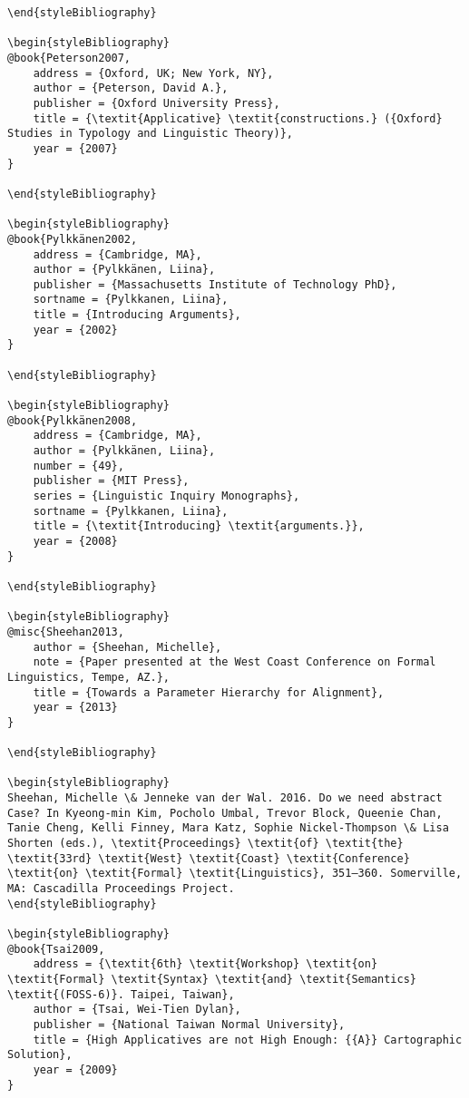 \documentclass[output=paper]{langscibook}
\begin{document}
\begin{verbatim}
\end{styleBibliography}

\begin{styleBibliography}
@book{Peterson2007,
	address = {Oxford, UK; New York, NY},
	author = {Peterson, David A.},
	publisher = {Oxford University Press},
	title = {\textit{Applicative} \textit{constructions.} ({Oxford} Studies in Typology and Linguistic Theory)},
	year = {2007}
}

\end{styleBibliography}

\begin{styleBibliography}
@book{Pylkkänen2002,
	address = {Cambridge, MA},
	author = {Pylkkänen, Liina},
	publisher = {Massachusetts Institute of Technology PhD},
	sortname = {Pylkkanen, Liina},
	title = {Introducing Arguments},
	year = {2002}
}

\end{styleBibliography}

\begin{styleBibliography}
@book{Pylkkänen2008,
	address = {Cambridge, MA},
	author = {Pylkkänen, Liina},
	number = {49},
	publisher = {MIT Press},
	series = {Linguistic Inquiry Monographs},
	sortname = {Pylkkanen, Liina},
	title = {\textit{Introducing} \textit{arguments.}},
	year = {2008}
}

\end{styleBibliography}

\begin{styleBibliography}
@misc{Sheehan2013,
	author = {Sheehan, Michelle},
	note = {Paper presented at the West Coast Conference on Formal Linguistics, Tempe, AZ.},
	title = {Towards a Parameter Hierarchy for Alignment},
	year = {2013}
}

\end{styleBibliography}

\begin{styleBibliography}
Sheehan, Michelle \& Jenneke van der Wal. 2016. Do we need abstract Case? In Kyeong-min Kim, Pocholo Umbal, Trevor Block, Queenie Chan, Tanie Cheng, Kelli Finney, Mara Katz, Sophie Nickel-Thompson \& Lisa Shorten (eds.), \textit{Proceedings} \textit{of} \textit{the} \textit{33rd} \textit{West} \textit{Coast} \textit{Conference} \textit{on} \textit{Formal} \textit{Linguistics}, 351–360. Somerville, MA: Cascadilla Proceedings Project.
\end{styleBibliography}

\begin{styleBibliography}
@book{Tsai2009,
	address = {\textit{6th} \textit{Workshop} \textit{on} \textit{Formal} \textit{Syntax} \textit{and} \textit{Semantics} \textit{(FOSS-6)}. Taipei, Taiwan},
	author = {Tsai, Wei-Tien Dylan},
	publisher = {National Taiwan Normal University},
	title = {High Applicatives are not High Enough: {{A}} Cartographic Solution},
	year = {2009}
}


\end{verbatim}
\end{document}
